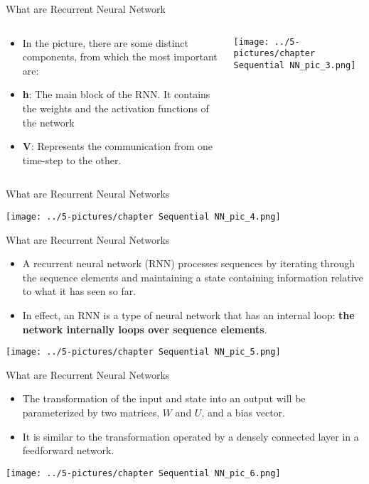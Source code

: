 \documentclass[11pt]{beamer}
\begin{document}
\begin{frame}{What are Recurrent Neural Network}
\begin{columns}[T] %
\begin{column}{.48\textwidth}
        \begin{itemize}
		\item In the picture, there are some distinct components, from which the most important are:
		\item \textbf{h}: The main block of the RNN. It contains the weights and the activation functions of the network
		\item \textbf{V}: Represents the communication from one time-step to the other.
        \end{itemize}
\end{column}%
\hfill%
\begin{column}{.48\textwidth}
        \texttt{[image: ../5-pictures/chapter Sequential NN\_pic\_3.png]}
\end{column}%
\end{columns}
\end{frame}
\begin{frame}{What are Recurrent Neural Networks}
	\begin{center}
	\texttt{[image: ../5-pictures/chapter Sequential NN\_pic\_4.png]}
	\end{center}
\end{frame}
\begin{frame}{What are Recurrent Neural Networks}
	\begin{itemize}
		\item A recurrent neural network (RNN) processes sequences by iterating through the sequence elements and maintaining a state containing information relative to what it has seen so far. 
		\item In effect, an RNN is a type of neural network that has an internal loop: \textbf{the network internally loops over sequence elements}.
	\end{itemize}
	\begin{center}
	\texttt{[image: ../5-pictures/chapter Sequential NN\_pic\_5.png]}
	\end{center}
\end{frame}
\begin{frame}{What are Recurrent Neural Networks}
	\begin{itemize}
		\item The transformation of the input and state into an output will be parameterized by two matrices, $W$ and $U$, and a bias vector. 
		\item It is similar to the transformation operated by a densely connected layer in a feedforward network.
	\end{itemize}
	\begin{center}
	\texttt{[image: ../5-pictures/chapter Sequential NN\_pic\_6.png]}
	\end{center}
\end{frame}
\end{document}
